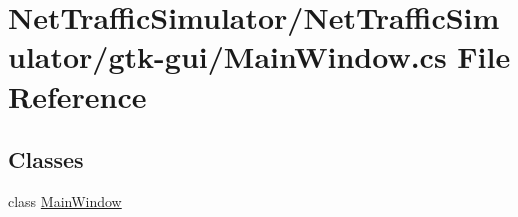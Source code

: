 \hypertarget{gtk-gui_2MainWindow_8cs}{\section{Net\-Traffic\-Simulator/\-Net\-Traffic\-Simulator/gtk-\/gui/\-Main\-Window.cs File Reference}
\label{gtk-gui_2MainWindow_8cs}
}
\subsection*{Classes}
\begin{DoxyCompactItemize}
\item 
class \hyperlink{classMainWindow}{Main\-Window}
\end{DoxyCompactItemize}
